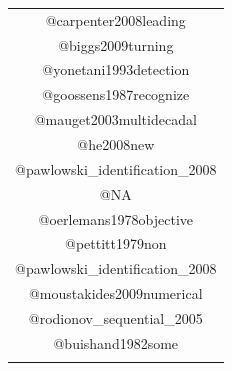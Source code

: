 \documentclass[12pt,twoside,openany]{reedthesis}
\begin{document}
\begin{longtable}[]{@{}c@{}}
\begin{minipage}[t]{0.44\columnwidth}
@carpenter2008leading\strut
\end{minipage}\tabularnewline
\begin{minipage}[t]{0.44\columnwidth}\centering\strut
@biggs2009turning\strut
\end{minipage}\tabularnewline
\begin{minipage}[t]{0.44\columnwidth}\centering\strut
@yonetani1993detection\strut
\end{minipage}\tabularnewline
\begin{minipage}[t]{0.44\columnwidth}\centering\strut
@goossens1987recognize\strut
\end{minipage}\tabularnewline
\begin{minipage}[t]{0.44\columnwidth}\centering\strut
@mauget2003multidecadal\strut
\end{minipage}\tabularnewline
\begin{minipage}[t]{0.44\columnwidth}\centering\strut
@he2008new\strut
\end{minipage}\tabularnewline
\begin{minipage}[t]{0.44\columnwidth}\centering\strut
@pawlowski\_identification\_2008\strut
\end{minipage}\tabularnewline
\begin{minipage}[t]{0.44\columnwidth}\centering\strut
@NA\strut
\end{minipage}\tabularnewline
\begin{minipage}[t]{0.44\columnwidth}\centering\strut
@oerlemans1978objective\strut
\end{minipage}\tabularnewline
\begin{minipage}[t]{0.44\columnwidth}\centering\strut
@pettitt1979non\strut
\end{minipage}\tabularnewline
\begin{minipage}[t]{0.44\columnwidth}\centering\strut
@pawlowski\_identification\_2008\strut
\end{minipage}\tabularnewline
\begin{minipage}[t]{0.44\columnwidth}\centering\strut
@moustakides2009numerical\strut
\end{minipage}\tabularnewline
\begin{minipage}[t]{0.44\columnwidth}\centering\strut
@rodionov\_sequential\_2005\strut
\end{minipage}\tabularnewline
\begin{minipage}[t]{0.44\columnwidth}\centering\strut
@buishand1982some\strut
\end{minipage}\tabularnewline
\begin{minipage}[t]{0.44\columnwidth}\centering\strut

\end{minipage}
\end{longtable}
\end{document}
